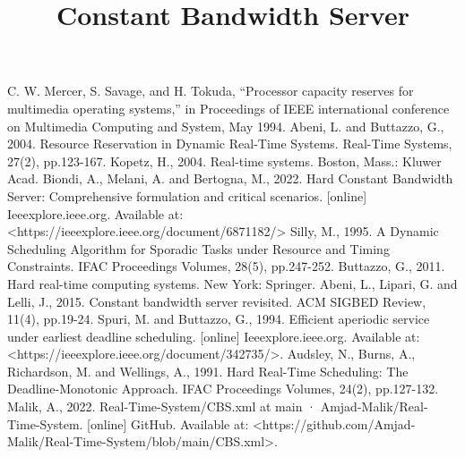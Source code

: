 \documentclass[conference]{IEEEtran}
\begin{document}
\title{Constant Bandwidth Server\\
}

\author{
}

\maketitle







\begin{thebibliography}{00}
	C. W. Mercer, S. Savage, and H. Tokuda, “Processor capacity reserves for multimedia operating systems,” in Proceedings of IEEE international conference on Multimedia Computing and System, May 1994.
	Abeni, L. and Buttazzo, G., 2004. Resource Reservation in Dynamic Real-Time Systems. Real-Time Systems, 27(2), pp.123-167.
	Kopetz, H., 2004. Real-time systems. Boston, Mass.: Kluwer Acad. 
	Biondi, A., Melani, A. and Bertogna, M., 2022. Hard Constant Bandwidth Server: Comprehensive formulation and critical scenarios. [online] Ieeexplore.ieee.org. Available at: <https://ieeexplore.ieee.org/document/6871182/> 
	Silly, M., 1995. A Dynamic Scheduling Algorithm for Sporadic Tasks under Resource and Timing Constraints. IFAC Proceedings Volumes, 28(5), pp.247-252. 
	Buttazzo, G., 2011. Hard real-time computing systems. New York: Springer. 
	Abeni, L., Lipari, G. and Lelli, J., 2015. Constant bandwidth server revisited. ACM SIGBED Review, 11(4), pp.19-24. 
	Spuri, M. and Buttazzo, G., 1994. Efficient aperiodic service under earliest deadline scheduling. [online] Ieeexplore.ieee.org. Available at: <https://ieeexplore.ieee.org/document/342735/>. 
	Audsley, N., Burns, A., Richardson, M. and Wellings, A., 1991. Hard Real-Time Scheduling: The Deadline-Monotonic Approach. IFAC Proceedings Volumes, 24(2), pp.127-132.
	Malik, A., 2022. Real-Time-System/CBS.xml at main · Amjad-Malik/Real-Time-System. [online] GitHub. Available at: <https://github.com/Amjad-Malik/Real-Time-System/blob/main/CBS.xml>.
\end{thebibliography}
\end{document}
